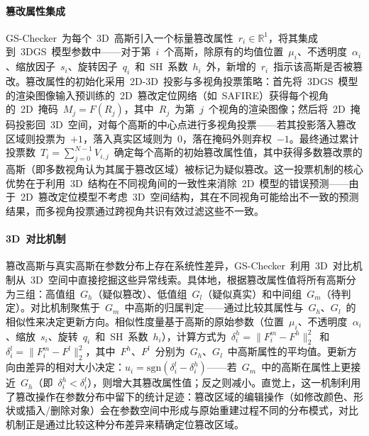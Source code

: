 \paragraph{篡改属性集成} GS-Checker~为每个~3D~高斯引入一个标量篡改属性~$r_i \in \mathbb{R}^1$，将其集成到~3DGS~模型参数中——对于第~$i$~个高斯，除原有的均值位置~$\mu_i$、不透明度~$\alpha_i$、缩放因子~$s_i$、旋转因子~$q_i$~和~SH~系数~$h_i$~外，新增的~$r_i$~指示该高斯是否被篡改。篡改属性的初始化采用~2D-3D~投影与多视角投票策略：首先将~3DGS~模型的渲染图像输入预训练的~2D~篡改定位网络（如~SAFIRE）获得每个视角的~2D~掩码~$M_j = F(R_j)$，其中~$R_j$~为第~$j$~个视角的渲染图像；然后将~2D~掩码投影回~3D~空间，对每个高斯的中心点进行多视角投票——若其投影落入篡改区域则投票为~$+1$，落入真实区域则为~$0$，落在掩码外则弃权~$-1$。最终通过累计投票数~$T_i = \sum_{j=0}^{N-1} V_{i,j}$~确定每个高斯的初始篡改属性值，其中获得多数篡改票的高斯（即多数视角认为其属于篡改区域）被标记为疑似篡改。这一投票机制的核心优势在于利用~3D~结构在不同视角间的一致性来消除~2D~模型的错误预测——由于~2D~篡改定位模型不考虑~3D~空间结构，其在不同视角可能给出不一致的预测结果，而多视角投票通过跨视角共识有效过滤这些不一致。

\paragraph{3D~对比机制} 篡改高斯与真实高斯在参数分布上存在系统性差异，GS-Checker~利用~3D~对比机制从~3D~空间中直接挖掘这些异常线索。具体地，根据篡改属性值将所有高斯分为三组：高值组~$G_h$（疑似篡改）、低值组~$G_l$（疑似真实）和中间组~$G_m$（待判定）。对比机制聚焦于~$G_m$~中高斯的归属判定——通过比较其属性与~$G_h$、$G_l$~的相似性来决定更新方向。相似性度量基于高斯的原始参数（位置~$\mu_i$、不透明度~$\alpha_i$、缩放~$s_i$、旋转~$q_i$~和~SH~系数~$h_i$），计算方式为~$\delta_i^h = \|F_i^m - F^h\|_2^2$~和~$\delta_i^l = \|F_i^m - F^l\|_2^2$，其中~$F^h$、$F^l$~分别为~$G_h$、$G_l$~中高斯属性的平均值。更新方向由差异的相对大小决定：$u_i = \mathrm{sgn}(\delta_i^l - \delta_i^h)$——若~$G_m$~中的高斯在属性上更接近~$G_h$（即~$\delta_i^h < \delta_i^l$），则增大其篡改属性值；反之则减小。直觉上，这一机制利用了篡改操作在参数分布中留下的统计足迹：篡改区域的编辑操作（如修改颜色、形状或插入/删除对象）会在参数空间中形成与原始重建过程不同的分布模式，对比机制正是通过比较这种分布差异来精确定位篡改区域。

